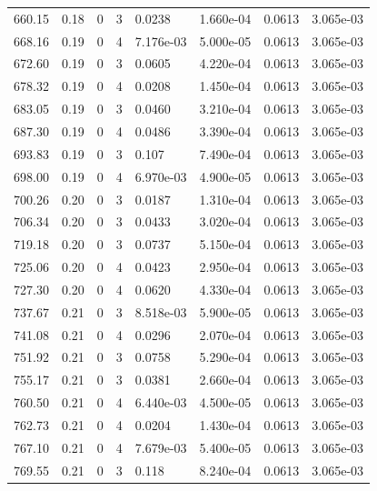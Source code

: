 \documentclass[preview]{standalone}
\begin{document}
{{{{{\begin{tabular}{L{1.2cm}C{1.2cm} C{0.3cm}C{0.5cm} C{1.4cm}C{1.4cm} C{1.4cm}C{1.4cm}}
  660.15  &  0.18  & 0     &  3 &  0.0238  & 1.660e-04  & 0.0613 &  3.065e-03   \\ 
  668.16  &  0.19  & 0     &  4 &  7.176e-03  & 5.000e-05  & 0.0613 &  3.065e-03   \\ 
  672.60  &  0.19  & 0     &  3 &  0.0605  & 4.220e-04  & 0.0613 &  3.065e-03   \\ 
  678.32  &  0.19  & 0     &  4 &  0.0208  & 1.450e-04  & 0.0613 &  3.065e-03   \\ 
  683.05  &  0.19  & 0     &  3 &  0.0460  & 3.210e-04  & 0.0613 &  3.065e-03   \\ 
  687.30  &  0.19  & 0     &  4 &  0.0486  & 3.390e-04  & 0.0613 &  3.065e-03   \\ 
  693.83  &  0.19  & 0     &  3 &  0.107  & 7.490e-04  & 0.0613 &  3.065e-03   \\ 
  698.00  &  0.19  & 0     &  4 &  6.970e-03  & 4.900e-05  & 0.0613 &  3.065e-03   \\ 
  700.26  &  0.20  & 0     &  3 &  0.0187  & 1.310e-04  & 0.0613 &  3.065e-03   \\ 
  706.34  &  0.20  & 0     &  3 &  0.0433  & 3.020e-04  & 0.0613 &  3.065e-03   \\ 
  719.18  &  0.20  & 0     &  3 &  0.0737  & 5.150e-04  & 0.0613 &  3.065e-03   \\ 
  725.06  &  0.20  & 0     &  4 &  0.0423  & 2.950e-04  & 0.0613 &  3.065e-03   \\ 
  727.30  &  0.20  & 0     &  4 &  0.0620  & 4.330e-04  & 0.0613 &  3.065e-03   \\ 
  737.67  &  0.21  & 0     &  3 &  8.518e-03  & 5.900e-05  & 0.0613 &  3.065e-03   \\ 
  741.08  &  0.21  & 0     &  4 &  0.0296  & 2.070e-04  & 0.0613 &  3.065e-03   \\ 
  751.92  &  0.21  & 0     &  3 &  0.0758  & 5.290e-04  & 0.0613 &  3.065e-03   \\ 
  755.17  &  0.21  & 0     &  3 &  0.0381  & 2.660e-04  & 0.0613 &  3.065e-03   \\ 
  760.50  &  0.21  & 0     &  4 &  6.440e-03  & 4.500e-05  & 0.0613 &  3.065e-03   \\ 
  762.73  &  0.21  & 0     &  4 &  0.0204  & 1.430e-04  & 0.0613 &  3.065e-03   \\ 
  767.10  &  0.21  & 0     &  4 &  7.679e-03  & 5.400e-05  & 0.0613 &  3.065e-03   \\ 
  769.55  &  0.21  & 0     &  3 &  0.118  & 8.240e-04  & 0.0613 &  3.065e-03   \\ 

\end{tabular}}}}}}
\end{document}
